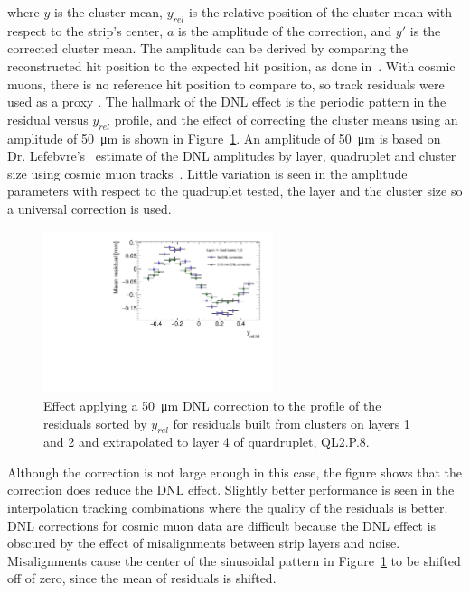 where $y$ is the cluster mean, $y_{rel}$ is the relative position of the cluster mean with respect to the strip's center, $a$ is the amplitude of the correction, and $y'$ is the corrected cluster mean. The amplitude can be derived by comparing the reconstructed hit position to the expected hit position, as done in~\cite{abusleme_performance_2016}. With cosmic muons, there is no reference hit position to compare to, so track residuals were used as a proxy \cite{lefebvre_thesis}. The hallmark of the DNL effect is the periodic pattern in the residual versus $y_{rel}$ profile, and the effect of correcting the cluster means using an amplitude of \SI{50}{\micro\meter} is shown in Figure~\ref{fig:dnl_corr_effect}. An amplitude of \SI{50}{\micro\meter} is based on Dr. Lefebvre's~\cite{lefebvre_thesis} estimate of the DNL amplitudes by layer, quadruplet and cluster size using cosmic muon tracks~\cite{lefebvre_thesis}. Little variation is seen in the amplitude parameters with respect to the quadruplet tested, the layer and the cluster size so a universal correction is used.

\begin{figure}
    \centering
    \includegraphics[width = 0.6\textwidth]{figures/figure_dnl_profiles_blue_QL2P08_3100V_2021-06-18_no_dnl_green_QL2P08_3100V_2021-06-18_2_50um_universal_DNL_layer4_fixed12.pdf}
    \caption{Effect applying a \SI{50}{\micro\meter} DNL correction to the profile of the residuals sorted by $y_{rel}$ for residuals built from clusters on layers 1 and 2 and extrapolated to layer 4 of quardruplet, QL2.P.8.}
    \label{fig:dnl_corr_effect}
\end{figure} 

Although the correction is not large enough in this case, the figure shows that the correction does reduce the DNL effect. Slightly better performance is seen in the interpolation tracking combinations where the quality of the residuals is better. DNL corrections for cosmic muon data are difficult because the DNL effect is obscured by the effect of misalignments between strip layers and noise. Misalignments cause the center of the sinusoidal pattern in Figure~\ref{fig:dnl_corr_effect} to be shifted off of zero, since the mean of residuals is shifted.

